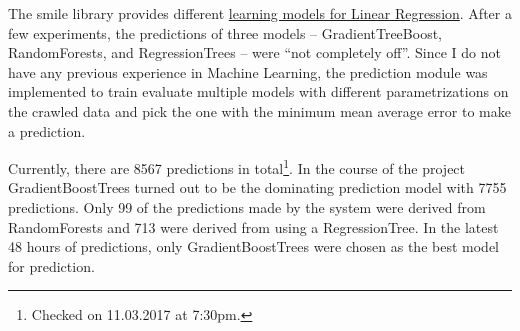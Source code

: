The smile library provides different \href{http://haifengl.github.io/smile/index.html}{learning models for Linear Regression}. After a few experiments, the predictions of three models -- GradientTreeBoost, RandomForests, and RegressionTrees -- were ``not completely off''. Since I do not have 
any previous experience in Machine Learning, the prediction module was implemented to train evaluate multiple models 
with different parametrizations on the crawled data and pick the one with the minimum mean average error to make a 
prediction. 

Currently, there are 8567 predictions in total\footnote{Checked on 11.03.2017 at 7:30pm.}. In the course of the 
project GradientBoostTrees turned out to be the dominating prediction model with 7755 predictions. Only 99 of the 
predictions made by the system were derived from RandomForests and 713 were derived from using a RegressionTree. In the latest 48 hours of predictions, only GradientBoostTrees were chosen as the best model for prediction. 